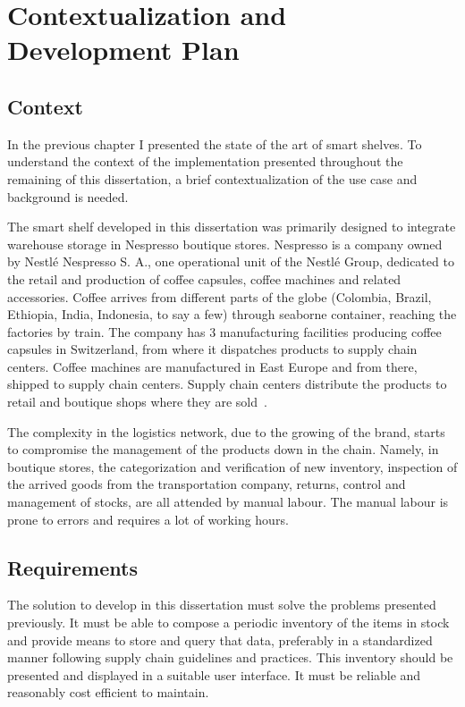 \chapter{Contextualization and Development Plan} \label{sec:developmentplan}

\section{Context}

In the previous chapter I presented the state of the art of smart shelves. 
To understand the context of the implementation presented throughout the remaining of this dissertation, a brief contextualization of the use case and background is needed.

The smart shelf developed in this dissertation was primarily designed to integrate warehouse storage in Nespresso boutique stores.
Nespresso is a company owned by Nestlé Nespresso S. A., one operational unit of the Nestlé Group, dedicated to the retail and production of coffee capsules, coffee machines and related accessories.
Coffee arrives from different parts of the globe (Colombia, Brazil, Ethiopia, India, Indonesia, to say a few) through seaborne container, reaching the factories by train.
The company has 3 manufacturing facilities producing coffee capsules in Switzerland, from where it dispatches products to supply chain centers.
Coffee machines are manufactured in East Europe and from there, shipped to supply chain centers.
Supply chain centers distribute the products to retail and boutique shops where they are sold~\cite{PortugalRecebeCentro}.

The  complexity  in  the logistics network, due to the growing of the brand, starts to compromise the management of the products down in the chain.
Namely, in boutique stores, the categorization and verification of new inventory, inspection of the arrived goods from the transportation company, returns, control and management of stocks, are all attended by manual labour. The manual labour is prone to errors and requires a lot of working hours.

\section{Requirements}

The solution to develop in this dissertation must solve the problems presented previously.
It must be able to compose a periodic inventory of the items in stock and provide means to store and query that data, preferably in a standardized manner following supply chain guidelines and practices.
This inventory should be presented and displayed in a suitable user interface.
It must be reliable and reasonably cost efficient to maintain.

